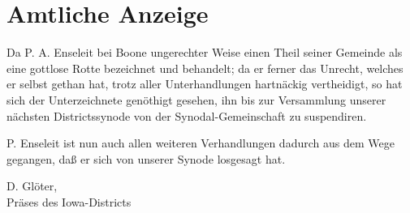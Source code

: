\chapter{Amtliche Anzeige}

Da P. A. Enseleit bei Boone ungerechter Weise einen Theil seiner Gemeinde als eine gottlose Rotte bezeichnet und behandelt; da er ferner das Unrecht, welches er selbst gethan hat, trotz aller Unterhandlungen hartnäckig vertheidigt, so hat sich der Unterzeichnete genöthigt gesehen, ihn bis zur Versammlung unserer nächsten Districtssynode von der Synodal-Gemeinschaft zu suspendiren.

P. Enseleit ist nun auch allen weiteren Verhandlungen dadurch aus dem Wege gegangen, daß er sich von unserer Synode losgesagt hat.

\begin{unterschrift}
D. Glöter,\\
Präses des Iowa-Districts
\end{unterschrift}
